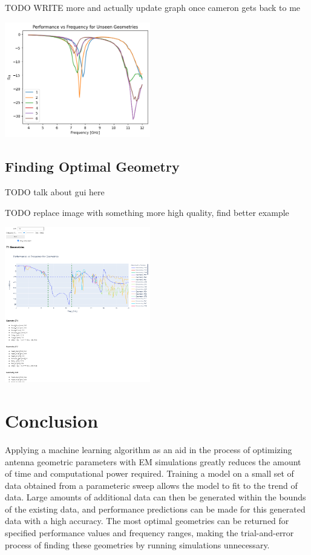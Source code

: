 \documentclass[lettersize,journal]{IEEEtran}
\newenvironment{Figure}
    {\par\medskip\noindent\minipage{\linewidth}}
    {\endminipage\par\medskip}
\begin{document}
TODO WRITE more and actually update graph once cameron gets back to me 

\begin{Figure}
    \centering
    \includegraphics[width=2.5in]{unseen_geometries_freq_vs_seq}
    \label{unseen_geometries_graph}
\end{Figure}

\subsection{Finding Optimal Geometry}
TODO talk about gui here 

TODO replace image with something more high quality, find better example 

\begin{Figure}
    \centering
    \includegraphics[width=2.5in]{gui}
    \label{gui}
\end{Figure}


\section{Conclusion}
Applying a machine learning algorithm as an aid in the process of optimizing  antenna geometric parameters with EM simulations greatly reduces the amount of time and computational power required. Training a model on a small set of data obtained from a parameteric sweep allows the model to fit to the trend of data. Large amounts of additional data can then be generated within the bounds of the existing data, and performance predictions can be made for this generated data with a high accuracy. The most optimal geometries can be returned for specified performance values and frequency ranges, making the trial-and-error process of finding these geometries by running simulations unnecessary. 
\end{document}
